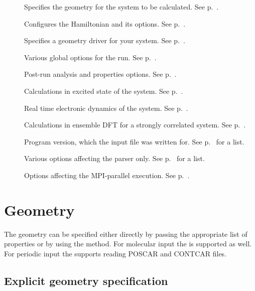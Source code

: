\begin{description}
\item[] Specifies the geometry for the system to be
  calculated.  See p.~.
\item[] Configures the Hamiltonian and its options. See
  p.~.
\item[] Specifies a geometry driver for your system.  See
  p.~.
\item[]  Various global options for the run. See
  p.~.
\item[]  Post-run analysis and properties options. See
  p.~.
\item[] Calculations in excited state of the system.
  See p.~.
\item[] Real time electronic dynamics of the system.  See
  p.~.
\item[] Calculations in ensemble DFT for a strongly correlated system.
  See p.~.
\item[] Program version, which the input file was
  written for. See p.~ for a list.
\item[] Various options affecting the parser only.
  See p.~ for a list.
\item[] Options affecting the MPI-parallel execution. See
  p.~.
\end{description}


\section{Geometry}
\label{sec:dftbp.Geometry}

The geometry can be specified either directly by passing the
appropriate list of properties or by using the 
method.
For molecular input the  is supported as well.
For periodic input the  supports reading POSCAR and CONTCAR files.

\subsection{Explicit geometry specification}

